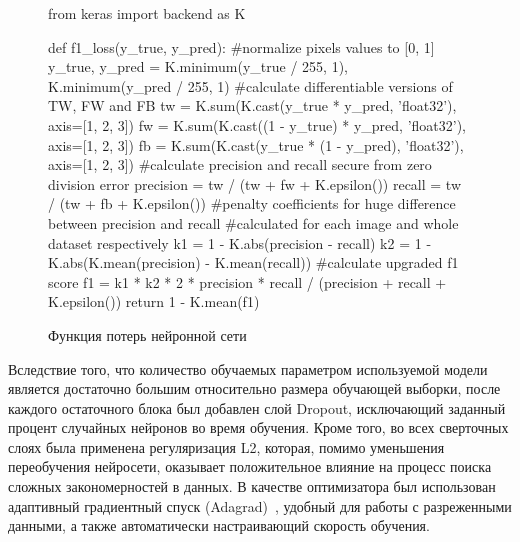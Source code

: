 \begin{figure}[h]
\begin{center}
\centering
\begin{python}
from keras import backend as K

def f1_loss(y_true, y_pred):
    #normalize pixels values to [0, 1]
    y_true, y_pred = K.minimum(y_true / 255, 1), K.minimum(y_pred / 255, 1)
    #calculate differentiable versions of TW, FW and FB
    tw = K.sum(K.cast(y_true * y_pred, 'float32'), axis=[1, 2, 3])
    fw = K.sum(K.cast((1 - y_true) * y_pred, 'float32'), axis=[1, 2, 3])
    fb = K.sum(K.cast(y_true * (1 - y_pred), 'float32'), axis=[1, 2, 3])
    #calculate precision and recall secure from zero division error
    precision = tw / (tw + fw + K.epsilon())
    recall = tw / (tw + fb + K.epsilon())
    #penalty coefficients for huge difference between precision and recall 
    #calculated for each image and whole dataset respectively
    k1 = 1 -  K.abs(precision - recall)
    k2 = 1 -  K.abs(K.mean(precision) - K.mean(recall))
    #calculate upgraded f1 score
    f1 = k1 * k2 * 2 * precision * recall / (precision + recall + K.epsilon()) 
    return 1 - K.mean(f1)
\end{python}
\caption{Функция потерь нейронной сети}
\label{loss}
\end{center}
\end{figure} 

Вследствие того, что количество обучаемых параметром используемой модели является достаточно большим относительно размера обучающей выборки, после каждого остаточного блока был добавлен слой Dropout, исключающий заданный процент случайных нейронов во время обучения. Кроме того, во всех сверточных слоях была применена регуляризация L2, которая, помимо уменьшения переобучения нейросети, оказывает положительное влияние на процесс поиска сложных закономерностей в данных. В качестве оптимизатора был использован адаптивный градиентный спуск (Adagrad)~\cite{duchi2011adaptive}, удобный для работы с разреженными данными, а также автоматически настраивающий скорость обучения.

